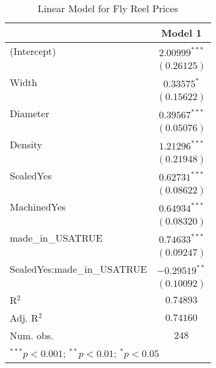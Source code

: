 
\begin{table}
\begin{center}
\begin{tabular}{l c}
\hline
 & Model 1 \\
\hline
(Intercept)                 & $2.00999^{***}$ \\
                            & $(0.26125)$     \\
Width                       & $0.33575^{*}$   \\
                            & $(0.15622)$     \\
Diameter                    & $0.39567^{***}$ \\
                            & $(0.05076)$     \\
Density                     & $1.21296^{***}$ \\
                            & $(0.21948)$     \\
SealedYes                   & $0.62731^{***}$ \\
                            & $(0.08622)$     \\
MachinedYes                 & $0.64934^{***}$ \\
                            & $(0.08320)$     \\
made\_in\_USATRUE           & $0.74633^{***}$ \\
                            & $(0.09247)$     \\
SealedYes:made\_in\_USATRUE & $-0.29519^{**}$ \\
                            & $(0.10092)$     \\
\hline
R$^2$                       & $0.74893$       \\
Adj. R$^2$                  & $0.74160$       \\
Num. obs.                   & $248$           \\
\hline
\multicolumn{2}{l}{\scriptsize{$^{***}p<0.001$; $^{**}p<0.01$; $^{*}p<0.05$}}
\end{tabular}
\caption{Linear Model for Fly Reel Prices}
\label{tab:reg_sealed_USA}
\end{center}
\end{table}
